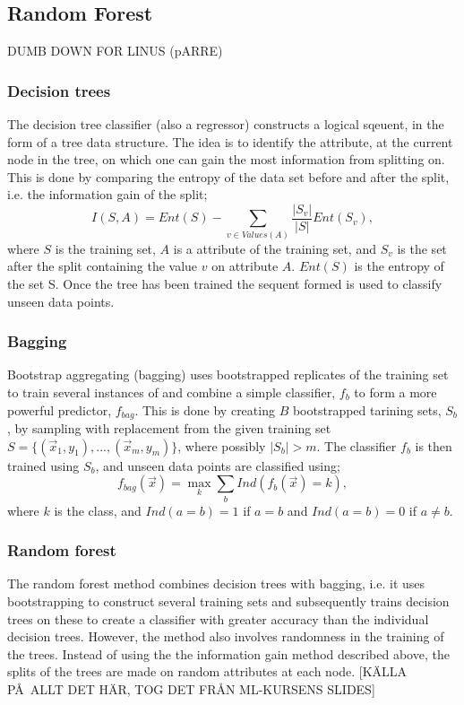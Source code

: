 \documentclass{article}
\begin{document}
\subsection{Random Forest}
DUMB DOWN FOR LINUS (pARRE)
\subsubsection{Decision trees}
The decision tree classifier (also a regressor) constructs a logical sqeuent, in the form of a tree data structure. The idea is to identify the attribute, at the current node in the tree, on which one can gain the most information from splitting on. This is done by comparing the entropy of the data set before and after the split, i.e. the information gain of the split;
\begin{equation}
I(S, A) = Ent(S) - \sum\limits_{v \in Values(A)} \frac{|S_v|}{|S|} Ent(S_v),
\end{equation}
where $S$ is the training set, $A$ is a attribute of the training set, and $S_v$ is the set after the split containing the value $v$ on attribute $A$. $Ent(S)$ is the entropy of the set S. Once the tree has been trained the sequent formed is used to classify unseen data points.
\subsubsection{Bagging}
Bootstrap aggregating (bagging) uses bootstrapped replicates of the training set to train several instances of and combine a simple classifier, $f_b$ to form a more powerful predictor, $f_{bag}$. This is done by creating $B$ bootstrapped tarining sets, $S_b$, by sampling with replacement from the given training set $S = \{ (\vec{x}_1, y_1), ..., (\vec{x}_m, y_m)\}$, where possibly $|S_b| > m$. The classifier $f_b$ is then trained using $S_b$, and unseen data points are classified using; 
\begin{equation}
f_{bag}(\vec{x}) = \max\limits_k \sum\limits_b Ind(f_b(\vec{x}) = k),
\end{equation}
where $k$ is the class, and $Ind(a = b) = 1$ if $a = b$ and $Ind(a = b) = 0$ if $a \ne b$.

\subsubsection{Random forest}
The random forest method combines decision trees with bagging, i.e. it uses bootstrapping to construct several training sets and subsequently trains decision trees on these to create a classifier with greater accuracy than the individual decision trees. However, the method also involves randomness in the training of the trees. Instead of using the the information gain method described above, the splits of the trees are made on random attributes at each node.  [K\"ALLA P\AA\ ALLT DET H\"AR, TOG DET FR\AA N ML-KURSENS SLIDES]
\end{document}

